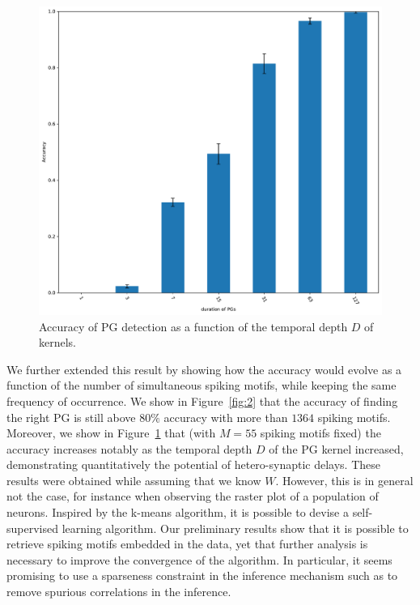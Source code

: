 \documentclass[11pt]{article}
\begin{document}
\begin{figure}
\vspace{-10pt}
\includegraphics[width=\linewidth]{figure_N_PG_time.pdf}
\vspace{-25pt}
{
\caption{Accuracy of PG detection as a function of the temporal depth $D$ of kernels.
}
\label{fig:3}
}
\vspace{-15pt}
\end{figure}
We further extended this result by showing how the accuracy would evolve as a function of the number of simultaneous spiking motifs, while keeping the same frequency of occurrence. We show in Figure~\ref{fig:2} that the accuracy of finding the right PG is still above $80\%$ accuracy with more than $1364$ spiking motifs. Moreover, we show in Figure~\ref{fig:3} that (with $M=55$ spiking motifs fixed) the accuracy increases notably as the temporal depth $D$ of the PG kernel increased, demonstrating quantitatively the potential of hetero-synaptic delays. These results were obtained while assuming that we know $W$. However, this is in general not the case, for instance when observing the raster plot of a population of neurons. Inspired by the k-means algorithm, it is possible to devise a self-supervised learning algorithm. Our preliminary results show that it is possible to retrieve spiking motifs embedded in the data, yet that further analysis is necessary to improve the convergence of the algorithm. In particular, it seems promising to use a sparseness constraint in the inference mechanism such as to remove spurious correlations in the inference.
\end{document}
